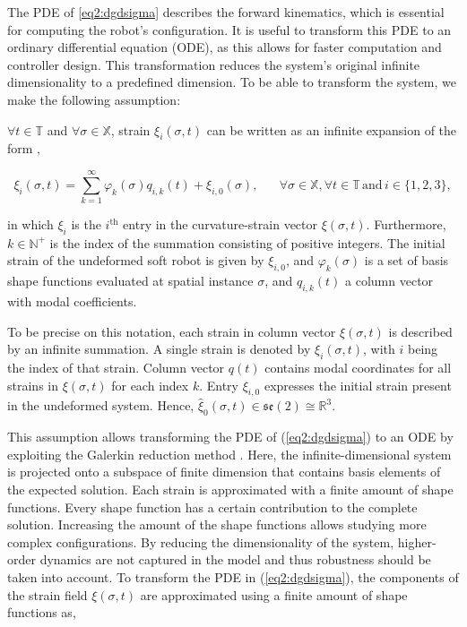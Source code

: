 The PDE of \ref{eq2:dgdsigma} describes the forward kinematics, which is essential for computing the robot's configuration. It is useful to transform this PDE to an ordinary differential equation (ODE), as this allows for faster computation and controller design. This transformation reduces the system's original infinite dimensionality to a predefined dimension. To be able to transform the system, we make the following assumption: 

\begin{theorem}

$\forall t \in \mathbb{T}$ and $\forall \sigma \in \mathbb{X}$, strain $\xi_i(\sigma,t)$ can be written as an infinite expansion of the form \cite{Caasenbrood2021},

\begin{equation}
\xi_i(\sigma,t) = \sum_{k=1}^\infty \varphi_k(\sigma)q_{i,k}(t) + \xi_{i,0}(\sigma), \hspace{20pt} \forall \sigma \in \mathbb{X}, \forall t \in \mathbb{T} \hspace{2pt} \text{and} \hspace{2pt} i \in \{1,2,3\},
\label{eq2:strainexact}
\end{equation}

in which $\xi_{i}$ is the $i^{\text{th}}$ entry in the curvature-strain vector $\xi(\sigma,t)$. Furthermore, $k \in \mathbb{N}^+$ is the index of the summation consisting of positive integers. The initial strain of the undeformed soft robot is given by $\xi_{i,0}$, and $\varphi_k(\sigma)$ is a set of basis shape functions evaluated at spatial instance $\sigma$, and $q_{i,k}(t)$ a column vector with modal coefficients. 
\end{theorem}

To be precise on this notation, each strain in column vector $\xi(\sigma,t)$ is described by an infinite summation. A single strain is denoted by $\xi_i(\sigma,t)$, with $i$ being the index of that strain. Column vector $q(t)$ contains modal coordinates for all strains in $\xi(\sigma,t)$ for each index $k$. Entry $\xi_{i,0}$ expresses the initial strain present in the undeformed system. Hence, $\hat{\xi}_0(\sigma,t) \in \mathfrak{se}(2) \cong \mathbb{R}^3$. 

This assumption allows transforming the PDE of (\ref{eq2:dgdsigma}) to an ODE by exploiting the Galerkin reduction method \cite{Galerkin}. Here, the infinite-dimensional system is projected onto a subspace of finite dimension that contains basis elements of the expected solution. Each strain is approximated with a finite amount of shape functions. Every shape function has a certain contribution to the complete solution. Increasing the amount of the shape functions allows studying more complex configurations. By reducing the dimensionality of the system, higher-order dynamics are not captured in the model and thus robustness should be taken into account. To transform the PDE in (\ref{eq2:dgdsigma}), the components of the strain field $\xi(\sigma,t)$ are approximated using a finite amount of shape functions as,

